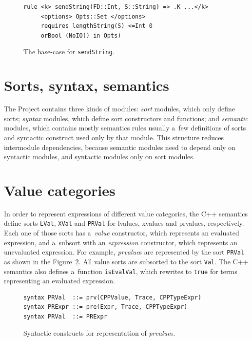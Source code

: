 \documentclass[nolot,nolof,nocover,printed]{fithesis3}
\newcommand{\Project}{Project\xspace}
\begin{document}
\begin{figure}[hp]
\begin{lstlisting}
rule <k> sendString(FD::Int, S::String) => .K ...</k>
     <options> Opts::Set </options>
     requires lengthString(S) <=Int 0
     orBool (NoIO() in Opts)
\end{lstlisting}
\caption{The base-case for \lstinline|sendString|.}
\label{fig:exampleCSemanticsRule2}
\end{figure}


\section{Sorts, syntax, semantics}

The \Project contains three kinds of modules: \textit{sort} modules, which only define sorts; \textit{syntax} modules, which define sort constructors and functions; and \textit{semantic} modules, which contains mostly semantics rules usually a~few definitions of sorts and syntactic construct used only by that module. This structure reduces intermodule dependencies, because semantic modules need to depend only on syntactic modules, and syntactic modules only on sort modules.

\section{Value categories}\label{sec:proj:values}

In order to represent expressions of different value categories, the C++ semantics define sorts \lstinline|LVal|, \lstinline|XVal| and \lstinline|PRVal| for lvalues, xvalues and prvalues, respectively. Each one of those sorts has a~\textit{value} constructor, which represents an evaluated expression, and a~subsort with an \textit{expression} constructor, which represents an unevaluated expression. For example, \textit{prvalue}s are represented by the sort \lstinline|PRVal| as shown in the Figure~\ref{fig:prvSyntax}. All value sorts are subsorted to the sort \lstinline|Val|. The C++ semantics also defines a~function \lstinline|isEvalVal|, which rewrites to \lstinline|true| for terms representing an evaluated expression.

\begin{figure}[hp]
\begin{lstlisting}
syntax PRVal  ::= prv(CPPValue, Trace, CPPTypeExpr)
syntax PRExpr ::= pre(Expr, Trace, CPPTypeExpr)
syntax PRVal  ::= PRExpr
\end{lstlisting}
\caption{Syntactic constructs for representation of \textit{prvalue}s.}
\label{fig:prvSyntax}
\end{figure}
\end{document}
